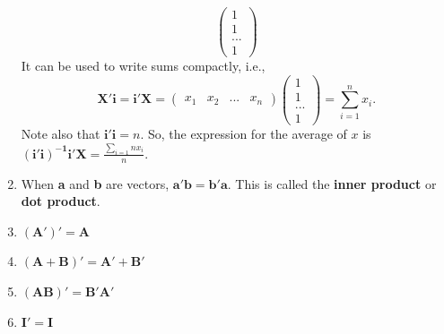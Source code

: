 \documentclass[11pt]{article}
\theoremstyle{definition}
\theoremstyle{remark}
\begin{document}
\begin{enumerate}
$$\begin{pmatrix}
1 \\
1 \\
... \\
1
\end{pmatrix}
$$
It can be used to write sums compactly, i.e., 
$$
\mathbf{X'i}=\mathbf{i'X} =
\begin{pmatrix}
x_1&x_2&...&x_n
\end{pmatrix}
\begin{pmatrix}
1 \\
1 \\
... \\
1
\end{pmatrix}
= \sum_{i=1}^{n}x_i.
$$
Note also that $\mathbf{i'i}=n$. So, the expression for the average of $x$ is $\mathbf{(i'i)^{-1}i'X}=\frac{\sum_{i=1}{n}x_i}{n}.$
\item When \textbf{a} and \textbf{b} are vectors, $\mathbf{a'b = b'a}$. This is called the \textbf{inner product} or \textbf{dot product}.

\item $\mathbf{(A')' = A}$
\item $\mathbf{(A + B)' = A' + B'}$
\item $\mathbf{(AB)' = B'A'}$
\item $\mathbf{I' = I}$
\end{enumerate}
\end{document}
